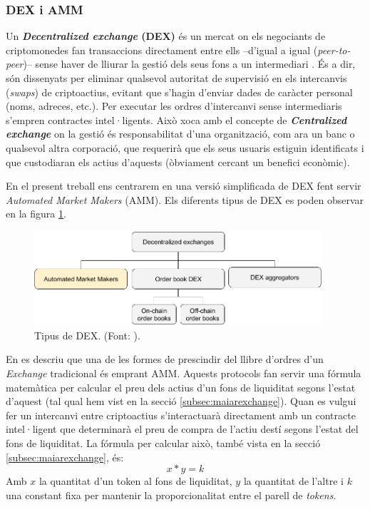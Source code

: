 \documentclass[11pt,a4paper]{article}
\begin{document}
\subsubsection{DEX i AMM}\label{subsub:dexamm}

Un \textbf{\textit{Decentralized exchange} (DEX)} és un mercat on els negociants de criptomonedes fan transaccions directament entre ells –d'igual a igual (\textit{peer-to-peer})– sense haver de lliurar la gestió dels seus fons a un intermediari \cite{cointelegraph}. És a dir, són dissenyats per eliminar qualsevol autoritat de supervisió en els intercanvis (\textit{swaps}) de criptoactius, evitant que s'hagin d'enviar dades de caràcter personal (noms, adreces, etc.). Per executar les ordres d'intercanvi sense intermediaris s'empren contractes intel·ligents. Això xoca amb el concepte de \textit{\textbf{Centralized exchange}} on la gestió és responsabilitat d'una organització, com ara un banc o qualsevol altra corporació, que requerirà que els seus usuaris estiguin identificats i que custodiaran els actius d'aquests (òbviament cercant un benefici econòmic).
 
En el present treball ens centrarem en una versió simplificada de DEX fent servir \textit{Automated Market Makers} (AMM). Els diferents tipus de DEX es poden observar en la figura \ref{fig:dextypes}.
\begin{figure}[h]
\includegraphics[width=0.95\textwidth]{DEXtypes.png}
\centering
\caption{Tipus de DEX. (Font: \cite{cointelegraph}).}\label{fig:dextypes}
\end{figure} 

En \cite{delarosa} es descriu que una de les formes de prescindir del llibre d'ordres d'un \textit{Exchange} tradicional és emprant AMM. Aquests protocols fan servir una fórmula matemàtica per calcular el preu dels actius d'un fons de liquiditat segons l'estat d'aquest (tal qual hem vist en la secció \ref{subsec:maiarexchange}). Quan es vulgui fer un intercanvi entre criptoactius s'interactuarà directament amb un contracte intel·ligent que determinarà el preu de compra de l'actiu destí segons l'estat del fons de liquiditat. La fórmula per calcular això, també vista en la secció \ref{subsec:maiarexchange}, és:
\[x * y = k\]
Amb \(x\) la quantitat d'un token al fons de liquiditat, \(y\) la quantitat de l'altre i \(k\) una constant fixa per mantenir la proporcionalitat entre el parell de \textit{tokens}.
\end{document}

